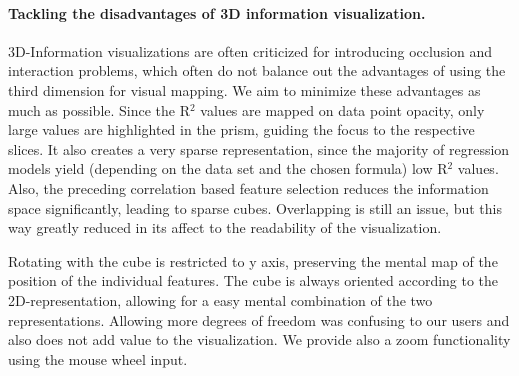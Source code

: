 \documentclass[journal]{style/vgtc} 			          %
\begin{document}
\paragraph{Tackling the disadvantages of 3D information visualization.}
3D-Information visualizations are often criticized for introducing occlusion and interaction problems, which often do not balance out the advantages of using the third dimension for visual mapping.
We aim to minimize these advantages as much as possible.
Since the R$^2$ values are mapped on data point opacity, only large values are highlighted in the prism, guiding the focus to the respective slices.
It also creates a very sparse representation, since the majority of regression models yield (depending on the data set and the chosen formula) low R$^2$ values.
Also, the preceding correlation based feature selection reduces the information space significantly, leading to sparse cubes.
Overlapping is still an issue, but this way greatly reduced in its affect to the readability of the visualization.

Rotating with the cube is restricted to y axis, preserving the mental map of the position of the individual features.
The cube is always oriented according to the 2D-representation, allowing for a easy mental combination of the two representations.
Allowing more degrees of freedom was confusing to our users and also does not add value to the visualization.
We provide also a zoom functionality using the mouse wheel input.
\end{document}
